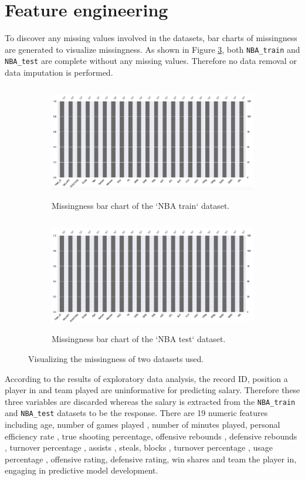 \documentclass[letterpaper,12pt,twoside,]{pinp}
\begin{document}
\hypertarget{feature-engineering}{%
\section{Feature engineering}\label{feature-engineering}}

To discover any missing values involved in the datasets, bar charts of
missingness are generated to visualize missingness. As shown in Figure
\ref{fig:missingness}, both \texttt{NBA\_train} and \texttt{NBA\_test}
are complete without any missing values. Therefore no data removal or
data imputation is performed.

\begin{figure}[H]
\begin{subfigure}{0.55\textwidth}
\includegraphics[width=0.9\linewidth, height=5cm]{nbaTrain_miss.png} 
\caption{Missingness bar chart of the `NBA train` dataset.}
\label{fig:trainMiss}
\end{subfigure}
\begin{subfigure}{0.55\textwidth}
\includegraphics[width=0.9\linewidth, height=5cm]{nbaTest_miss.png}
\caption{Missingness bar chart of the `NBA test` dataset.}
\label{fig:testMiss}
\end{subfigure}
\caption{Visualizing the missingness of two datasets used.}
\label{fig:missingness}
\end{figure}

According to the results of exploratory data analysis, the record ID,
position a player in and team played are uninformative for predicting
salary. Therefore these three variables are discarded whereas the salary
is extracted from the \texttt{NBA\_train} and \texttt{NBA\_test}
datasets to be the response. There are 19 numeric features including
age, number of games played , number of minutes played, personal
efficiency rate , true shooting percentage, offensive rebounds ,
defensive rebounds , turnover percentage , assists , steals, blocks ,
turnover percentage , usage percentage , offensive rating, defensive
rating, win shares and team the player in, engaging in predictive model
development.
\end{document}
